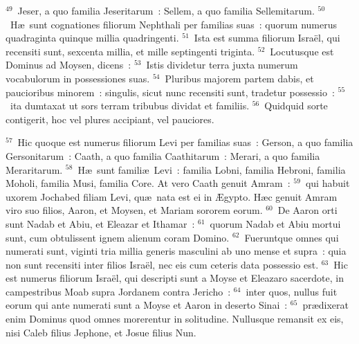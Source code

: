 ${}^{49}$~Jeser, a quo familia Jeseritarum~: Sellem, a quo familia Sellemitarum.
${}^{50}$~H\ae\ sunt cognationes filiorum Nephthali per familias suas~: quorum numerus quadraginta quinque millia quadringenti.
${}^{51}$~Ista est summa filiorum Isra\"el, qui recensiti sunt, sexcenta millia, et mille septingenti triginta.
${}^{52}$~Locutusque est Dominus ad Moysen, dicens~:
${}^{53}$~Istis dividetur terra juxta numerum vocabulorum in possessiones suas.
${}^{54}$~Pluribus majorem partem dabis, et paucioribus minorem~: singulis, sicut nunc recensiti sunt, tradetur possessio~:
${}^{55}$~ita dumtaxat ut sors terram tribubus dividat et familiis.
${}^{56}$~Quidquid sorte contigerit, hoc vel plures accipiant, vel pauciores.


${}^{57}$~Hic quoque est numerus filiorum Levi per familias suas~: Gerson, a quo familia Gersonitarum~: Caath, a quo familia Caathitarum~: Merari, a quo familia Meraritarum.
${}^{58}$~H\ae\ sunt famili\ae\ Levi~: familia Lobni, familia Hebroni, familia Moholi, familia Musi, familia Core. At vero Caath genuit Amram~:
${}^{59}$~qui habuit uxorem Jochabed filiam Levi, qu\ae\ nata est ei in \AE gypto. H\ae c genuit Amram viro suo filios, Aaron, et Moysen, et Mariam sororem eorum.
${}^{60}$~De Aaron orti sunt Nadab et Abiu, et Eleazar et Ithamar~:
${}^{61}$~quorum Nadab et Abiu mortui sunt, cum obtulissent ignem alienum coram Domino.
${}^{62}$~Fueruntque omnes qui numerati sunt, viginti tria millia generis masculini ab uno mense et supra~: quia non sunt recensiti inter filios Isra\"el, nec eis cum ceteris data possessio est.
${}^{63}$~Hic est numerus filiorum Isra\"el, qui descripti sunt a Moyse et Eleazaro sacerdote, in campestribus Moab supra Jordanem contra Jericho~:
${}^{64}$~inter quos, nullus fuit eorum qui ante numerati sunt a Moyse et Aaron in deserto Sinai~:
${}^{65}$~pr\ae dixerat enim Dominus quod omnes morerentur in solitudine. Nullusque remansit ex eis, nisi Caleb filius Jephone, et Josue filius Nun.

